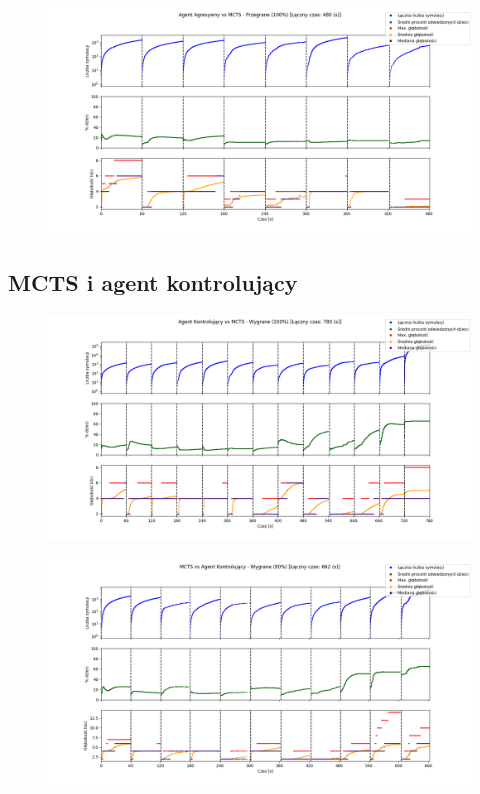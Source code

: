     \begin{figure}[H]
      \center
      \includegraphics[width=\textwidth]{imgs/plots/AA_MCTS_LOST.png}
    \end{figure}


  \pagebreak
  \subsection{MCTS i agent kontrolujący}

    \begin{figure}[H]
        \center
        \includegraphics[width=\textwidth]{imgs/plots/CA_MCTS_WIN.png}
    \end{figure}

    \begin{figure}[H]
        \center
        \includegraphics[width=\textwidth]{imgs/plots/MCTS_CA_WIN.png}
    \end{figure}

